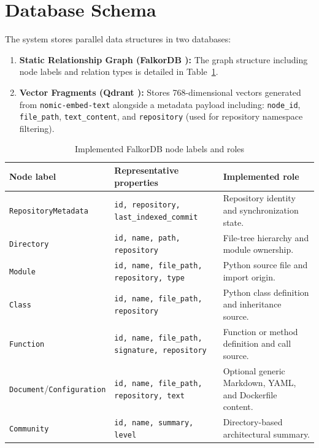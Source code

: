 \documentclass[12pt,letterpaper,oneside]{report}
\begin{document}
\section{Database Schema}
The system stores parallel data structures in two databases:
\begin{enumerate}
    \item \textbf{Static Relationship Graph (FalkorDB \cite{falkordb2024}):} The graph structure including node labels and relation types is detailed in Table~\ref{tab:graph_schema}.
    \item \textbf{Vector Fragments (Qdrant \cite{qdrant2024}):} Stores 768-dimensional vectors generated from \texttt{nomic-embed-text} alongside a metadata payload including: \texttt{node\_id}, \texttt{file\_path}, \texttt{text\_content}, and \texttt{repository} (used for repository namespace filtering).
\end{enumerate}

\begin{table}[H]
    \centering
    \caption{Implemented FalkorDB node labels and roles}
    \label{tab:graph_schema}
    \small
    \begin{tabular}{p{3.1cm}p{4.5cm}p{5.5cm}}
        \toprule
        \textbf{Node label} & \textbf{Representative properties} & \textbf{Implemented role} \\
        \midrule
        \texttt{Repository\allowbreak Metadata} & \texttt{id, repository, last\_indexed\_commit} & Repository identity and synchronization state. \\
        \texttt{Directory} & \texttt{id, name, path, repository} & File-tree hierarchy and module ownership. \\
        \texttt{Module} & \texttt{id, name, file\_path, repository, type} & Python source file and import origin. \\
        \texttt{Class} & \texttt{id, name, file\_path, repository} & Python class definition and inheritance source. \\
        \texttt{Function} & \texttt{id, name, file\_path, signature, repository} & Function or method definition and call source. \\
        \texttt{Document}/\allowbreak\texttt{Configuration} & \texttt{id, name, file\_path, repository, text} & Optional generic Markdown, YAML, and Dockerfile content. \\
        \texttt{Community} & \texttt{id, name, summary, level} & Directory-based architectural summary. \\
        \bottomrule
    \end{tabular}
\end{table}
\end{document}
